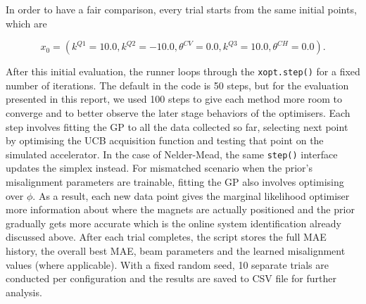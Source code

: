 In order to have a fair comparison, every trial starts from the same initial points, which are

\begin{equation}
    x_{0} = (k^{Q1}=10.0, k^{Q2}=-10.0, \theta^{CV} = 0.0, k^{Q3} = 10.0, \theta^{CH} = 0.0).
\end{equation}

After this initial evaluation, the runner loops through the \texttt{xopt.step()} for a fixed number of iterations. 
The default in the code is 50 steps, but for the evaluation presented in this report, we used 100 steps to give each 
method more room to converge and to better observe the later stage behaviors of the optimisers. Each step involves 
fitting the GP to all the data collected so far, selecting next point by optimising the UCB acquisition function 
and testing that point on the simulated accelerator. In the case of Nelder-Mead, the same \texttt{step()} interface 
updates the simplex instead. For mismatched scenario when the prior’s misalignment parameters are trainable, fitting 
the GP also involves optimising over \textbf{$\phi$}. As a result, each new data point gives the marginal likelihood 
optimiser more information about where the magnets are actually positioned and the prior gradually gets more accurate 
which is the online system identification already discussed above. After each trial completes, the script stores the 
full MAE history, the overall best MAE, beam parameters and the learned misalignment values (where applicable). With a fixed random seed, 
10 separate trials are conducted per configuration and the results are saved to CSV file for further analysis. 




